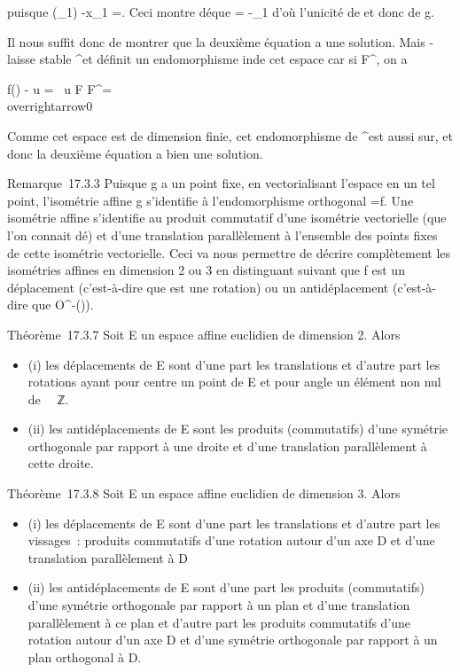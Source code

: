 \documentclass[]{article}
\begin{document}
puisque
\vecf(\overrightarrowx\_1)
-\overrightarrow x\_1
=. Ceci montre dé que
\overrightarrow\xi =
-\overrightarrowa\_1 d'où l'unicité de
\overrightarrow\xi et donc de g.

Il nous suffit donc de montrer que la deuxième équation a une solution.
Mais \vecf -\mathrmId laisse
stable \overrightarrowF^\bot et définit un
endomorphisme in\jmathectif de cet espace car si
\overrightarrowu \in\overrightarrow
F^\bot, on a

f(\overrightarrowu) -\overrightarrow
u =
\rigtharrow~\overrightarrow u \in\overrightarrow
F \bigcap\overrightarrow F^\bot =
\\overrightarrow0\

Comme cet espace est de dimension finie, cet endomorphisme de
\overrightarrowF^\bot est aussi sur\jmathectif, et
donc la deuxième équation a bien une solution.

Remarque~17.3.3 Puisque g a un point fixe, en vectorialisant l'espace en
un tel point, l'isométrie affine g s'identifie à l'endomorphisme
orthogonal \vecg =\vec f. Une
isométrie affine s'identifie au produit commutatif d'une isométrie
vectorielle (que l'on connait dé) et d'une translation parallèlement à
l'ensemble des points fixes de cette isométrie vectorielle. Ceci va nous
permettre de décrire complètement les isométries affines en dimension 2
ou 3 en distinguant suivant que f est un déplacement (c'est-à-dire que
\vecf est une rotation) ou un antidéplacement
(c'est-à-dire que \vecf \in
O^-(\overrightarrowE)).

Théorème~17.3.7 Soit E un espace affine euclidien de dimension 2. Alors

\begin{itemize}
\itemsep1pt\parskip0pt
\item
  (i) les déplacements de E sont d'une part les translations et d'autre
  part les rotations ayant pour centre un point de E et pour angle un
  élément non nul de ~\pi~ℤ.
\item
  (ii) les antidéplacements de E sont les produits (commutatifs) d'une
  symétrie orthogonale par rapport à une droite et d'une translation
  parallèlement à cette droite.
\end{itemize}

Théorème~17.3.8 Soit E un espace affine euclidien de dimension 3. Alors

\begin{itemize}
\itemsep1pt\parskip0pt
\item
  (i) les déplacements de E sont d'une part les translations et d'autre
  part les vissages~: produits commutatifs d'une rotation autour d'un
  axe D et d'une translation parallèlement à D
\item
  (ii) les antidéplacements de E sont d'une part les produits
  (commutatifs) d'une symétrie orthogonale par rapport à un plan et
  d'une translation parallèlement à ce plan et d'autre part les produits
  commutatifs d'une rotation autour d'un axe D et d'une symétrie
  orthogonale par rapport à un plan orthogonal à D.
\end{itemize}
\end{document}
